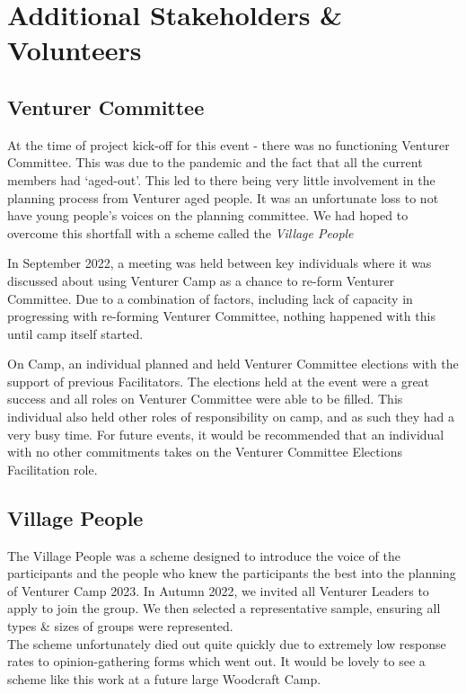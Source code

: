 \chapter{Additional Stakeholders \&  Volunteers}
\section{Venturer Committee}
At the time of project kick-off for this event - there was no functioning Venturer Committee. This was due to the pandemic and the fact that all the current members had `aged-out'. This led to there being very little involvement in the planning process from Venturer aged people. It was an unfortunate loss to not have young people's voices on the planning committee. We had hoped to overcome this shortfall with a scheme called the \textit{Village People}

In September 2022, a meeting was held between key individuals where it was discussed about using Venturer Camp as a chance to re-form Venturer Committee. Due to a combination of factors, including lack of capacity in progressing with re-forming Venturer Committee, nothing happened with this until camp itself started.

On Camp, an individual planned and held Venturer Committee elections with the support of previous Facilitators. The elections held at the event were a great success and all roles on Venturer Committee were able to be filled. This individual also held other roles of responsibility on camp, and as such they had a very busy time. For future events, it would be recommended that an individual with no other commitments takes on the Venturer Committee Elections Facilitation role.

\section{Village People}
The Village People was a scheme designed to introduce the voice of the participants and the people who knew the participants the best into the planning of Venturer Camp 2023. In Autumn 2022, we invited all Venturer Leaders to apply to join the group. We then selected a representative sample, ensuring all types \& sizes of groups were represented.\\

The scheme unfortunately died out quite quickly due to extremely low response rates to opinion-gathering forms which went out. It would be lovely to see a scheme like this work at a future large Woodcraft Camp. 

